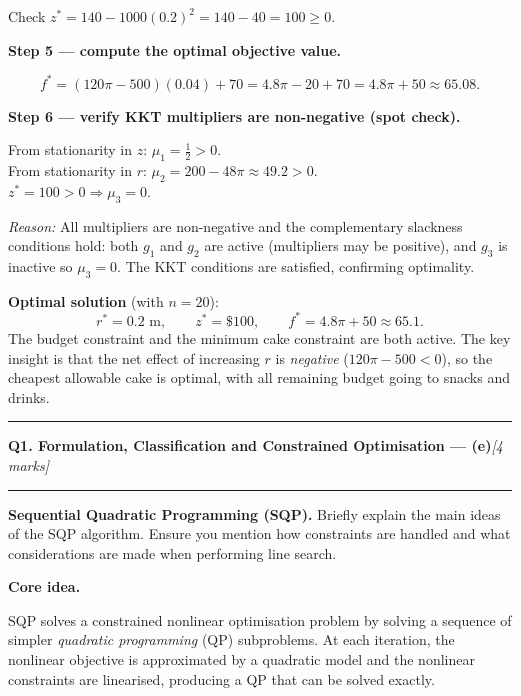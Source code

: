 \documentclass[10pt,a4paper]{article}
\newcommand{\sectitle}[2]{%
  \vspace{10pt}\noindent\rule{\linewidth}{0.8pt}\par\vspace{2pt}%
  {\large\textbf{#1}\hfill\normalsize\textit{[#2 marks]}}\par
  \vspace{2pt}\rule{\linewidth}{0.4pt}\vspace{4pt}}
\newcommand{\reason}[1]{%
  \begin{mdframed}[backgroundcolor=reasonbg, linewidth=0.4pt,
    innertopmargin=3pt, innerbottommargin=3pt,
    innerleftmargin=6pt, innerrightmargin=6pt]
    \small\textit{Reason:} \small #1
  \end{mdframed}\vspace{2pt}}
\newenvironment{resultbox}{%
  \begin{mdframed}[backgroundcolor=boxbg, linewidth=0.6pt,
    innertopmargin=5pt, innerbottommargin=5pt,
    innerleftmargin=8pt, innerrightmargin=8pt]
}{\end{mdframed}}
\begin{document}
Check $z^* = 140 - 1000(0.2)^2 = 140 - 40 = 100 \ge 0$. \checkmark

\textbf{Step 5 --- compute the optimal objective value.}

\[
  f^* = (120\pi - 500)(0.04) + 70 = 4.8\pi - 20 + 70 = 4.8\pi + 50 \approx 65.08.
\]

\textbf{Step 6 --- verify KKT multipliers are non-negative (spot check).}

From stationarity in $z$: $\mu_1 = \tfrac{1}{2} > 0$. \checkmark\\
From stationarity in $r$: $\mu_2 = 200 - 48\pi \approx 49.2 > 0$. \checkmark\\
$z^* = 100 > 0 \Rightarrow \mu_3 = 0$. \checkmark

\reason{All multipliers are non-negative and the complementary slackness
        conditions hold: both $g_1$ and $g_2$ are active (multipliers
        may be positive), and $g_3$ is inactive so $\mu_3 = 0$.
        The KKT conditions are satisfied, confirming optimality.}

\begin{resultbox}
\textbf{Optimal solution} (with $n=20$):
\[
  r^* = 0.2 \text{ m}, \qquad z^* = \$100, \qquad
  f^* = 4.8\pi + 50 \approx 65.1.
\]
The budget constraint and the minimum cake constraint are both active.
The key insight is that the net effect of increasing $r$ is
\emph{negative} ($120\pi - 500 < 0$), so the cheapest allowable cake
is optimal, with all remaining budget going to snacks and drinks.
\end{resultbox}

\newpage
\sectitle{Q1. Formulation, Classification and Constrained Optimisation --- (e)}{4}

\noindent\textbf{Sequential Quadratic Programming (SQP).} Briefly explain
the main ideas of the SQP algorithm. Ensure you mention how constraints
are handled and what considerations are made when performing line search.

\vspace{6pt}
\textbf{Core idea.}

SQP solves a constrained nonlinear optimisation problem by solving a
sequence of simpler \emph{quadratic programming} (QP) subproblems. At
each iteration, the nonlinear objective is approximated by a quadratic
model and the nonlinear constraints are linearised, producing a QP that
can be solved exactly.
\end{document}
